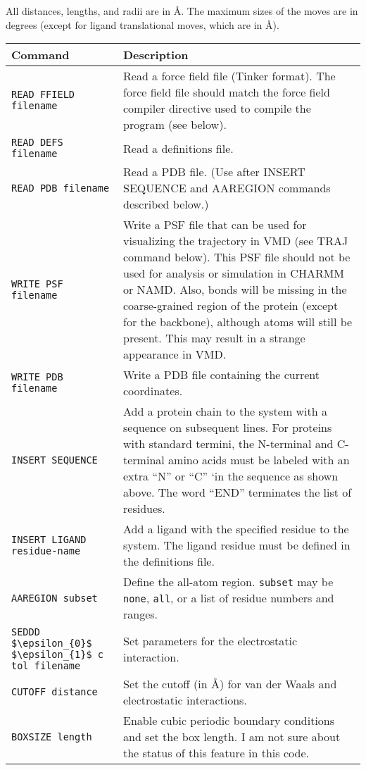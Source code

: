 \documentclass{article}      %
\begin{document}
All distances, lengths, and radii are in \AA.  The maximum sizes of the moves are in degrees (except for ligand translational moves, which are in \AA).

\begin{longtable}{|l|p{3.25in}|}
\hline
Command & Description \\
\hline
\verb+READ FFIELD filename+ & Read a force field file (Tinker format).  The force field file should match the force field compiler directive used to compile the program (see below).   \\
\hline
\verb+READ DEFS filename+ & Read a definitions file. \\
\hline
\verb+READ PDB filename+ & Read a PDB file. (Use after INSERT SEQUENCE and AAREGION commands described below.) \\
\hline
\verb+WRITE PSF filename+ & Write a PSF file that can be used for visualizing the trajectory in VMD (see TRAJ command below).  This PSF file should not be used for analysis or simulation in CHARMM or NAMD.  Also, bonds will be missing in the coarse-grained region of the  protein (except for the backbone), although atoms will still be present.  This may result in a strange appearance in VMD. \\
\hline
\verb+WRITE PDB filename+ & Write a PDB file containing the current coordinates. \\
\hline
\verb+INSERT SEQUENCE+ & Add a protein chain to the system with a sequence on subsequent lines.  For proteins with standard termini, the N-terminal and C-terminal amino acids must be labeled with an extra ``N'' or ``C'' `in the sequence as shown above.  The word ``END'' terminates the list of residues. \\
\hline
\verb+INSERT LIGAND residue-name+ & Add a ligand with the specified residue to the system.  The ligand residue must be defined in the definitions file.\\
\hline
\verb+AAREGION subset+ & Define the all-atom region.  \verb+subset+ may be \verb+none+, \verb+all+, or a list of residue numbers and ranges. \\
\hline
\verb+SEDDD $\epsilon_{0}$ $\epsilon_{1}$ c tol filename +& Set parameters for the electrostatic interaction. \\
\hline
\verb+CUTOFF distance+& Set the cutoff (in \AA) for van der Waals and electrostatic interactions. \\
\hline
\hline
\verb+BOXSIZE length+& Enable cubic periodic boundary conditions and set the box length.  I am not sure about the status of this feature in this code. \\

\end{longtable}
\end{document}
